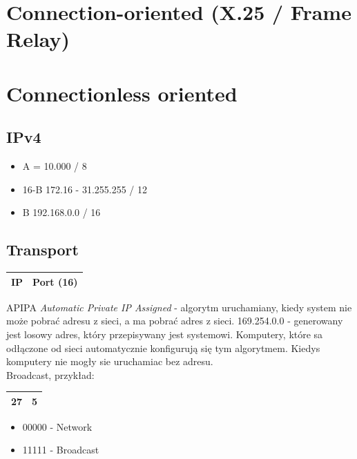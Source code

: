 \documentclass[a4paper,twoside]{article}
\begin{document}
\section{Connection-oriented (X.25 / Frame Relay)}
\section{Connectionless oriented}





\subsection{IPv4}

\begin{itemize}
	\item A = 10.000 / 8
	\item 16-B 172.16 - 31.255.255 / 12
	\item B 192.168.0.0 / 16
\end{itemize}
\subsection{Transport}
\begin{table}[h]
	\begin{tabular}{|c|c|}
		\hline
		IP	&	Port (16)	\\ \hline
	\end{tabular}
\end{table}
APIPA \emph{Automatic Private IP Assigned} - algorytm uruchamiany, kiedy system nie może pobrać adresu z sieci, a ma pobrać adres z sieci.
169.254.0.0 - generowany jest losowy adres, który przepisywany jest systemowi. Komputery, które sa odłączone od sieci automatycznie konfigurują się tym algorytmem. Kiedys komputery nie mogły sie uruchamiac bez adresu.\\
Broadcast, przykład:
\begin{table}[h]
	\begin{tabular}{|c|c|}
		\hline
		27	&	5	\\ \hline
	\end{tabular}
\end{table}
\begin{itemize}
	\item 00000 - Network
	\item 11111 - Broadcast
\end{itemize}
\end{document}
